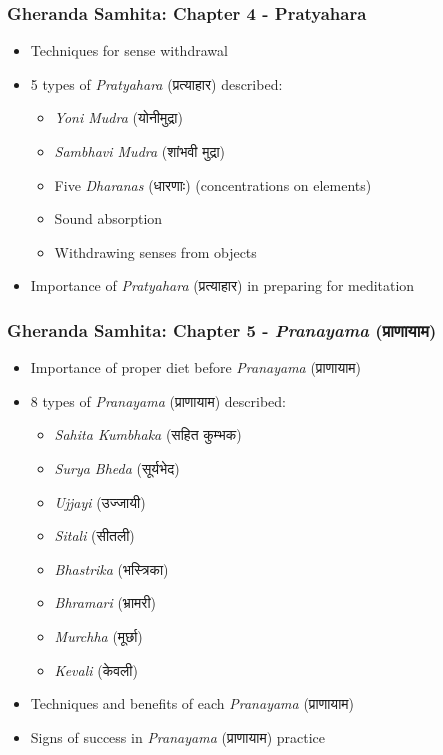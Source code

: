 \begin{frame}[fragile]\frametitle{Gheranda Samhita: Chapter 4 - Pratyahara}
\begin{itemize}
    \item Techniques for sense withdrawal
    \item 5 types of \textit{Pratyahara} (प्रत्याहार) described:
    \begin{itemize}
        \item \textit{Yoni Mudra} (योनीमुद्रा)
        \item \textit{Sambhavi Mudra} (शांभवी मुद्रा)
        \item Five \textit{Dharanas} (धारणाः) (concentrations on elements)
        \item Sound absorption
        \item Withdrawing senses from objects
    \end{itemize}
    \item Importance of \textit{Pratyahara} (प्रत्याहार) in preparing for meditation
\end{itemize}
\end{frame}


\begin{frame}[fragile]\frametitle{Gheranda Samhita: Chapter 5 - \textit{Pranayama} (प्राणायाम)}
\begin{itemize}
    \item Importance of proper diet before \textit{Pranayama} (प्राणायाम)
    \item 8 types of \textit{Pranayama} (प्राणायाम) described:
    \begin{itemize}
        \item \textit{Sahita Kumbhaka} (सहित कुम्भक)
        \item \textit{Surya Bheda} (सूर्यभेद)
        \item \textit{Ujjayi} (उज्जायी)
        \item \textit{Sitali} (सीतली)
        \item \textit{Bhastrika} (भस्त्रिका)
        \item \textit{Bhramari} (भ्रामरी)
        \item \textit{Murchha} (मूर्छा)
        \item \textit{Kevali} (केवली)
    \end{itemize}
    \item Techniques and benefits of each \textit{Pranayama} (प्राणायाम)
    \item Signs of success in \textit{Pranayama} (प्राणायाम) practice
\end{itemize}
\end{frame}


